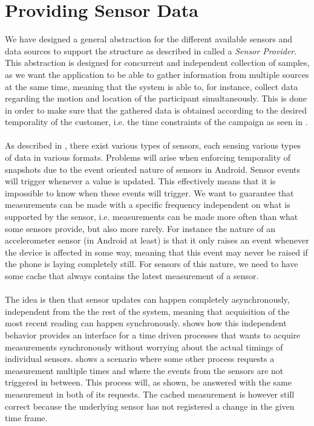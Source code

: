 
\section{Providing Sensor Data}
\label{sec:providing_sensor_data}

We have designed a general abstraction for the different available sensors and data sources to support the structure as described in  called a \emph{Sensor Provider}. This abstraction is designed for concurrent and independent collection of samples, as we want the application to be able to gather information from multiple sources at the same time, meaning that the system is able to, for instance, collect data regarding the motion and location of the participant simultaneously. This is done in order to make sure that the gathered data is obtained according to the desired temporality of the customer, i.e. the time constraints of the campaign as seen in .
\\\\
As described in , there exist various types of sensors, each sensing various types of data in various formats. Problems will arise when enforcing temporality of snapshots due to the event oriented nature of sensors in Android. Sensor events will trigger whenever a value is updated. This effectively means that it is impossible to know when these events will trigger. We want to guarantee that measurements can be made with a specific frequency independent on what is supported by the sensor, i.e. measurements can be made more often than what some sensors provide, but also more rarely. For instance the nature of an accelerometer sensor (in Android at least) is that it only raises an event whenever the device is affected in some way, meaning that this event may never be raised if the phone is laying completely still. For sensors of this nature, we need to have some cache that always contains the latest measurement of a sensor. 
\\\\
The idea is then that sensor updates can happen completely asynchronously, independent from the the rest of the system, meaning that acquisition of the most recent reading can happen synchronously.  shows how this independent behavior provides an interface for a time driven processes that wants to acquire measurements synchronously without worrying about the actual timings of individual sensors.  shows a scenario where some other process requests a measurement multiple times and where the events from the sensors are not triggered in between. This process will, as shown, be answered with the same measurement in both of its requests. The cached measurement is however still correct because the underlying sensor has not registered a change in the given time frame. 
